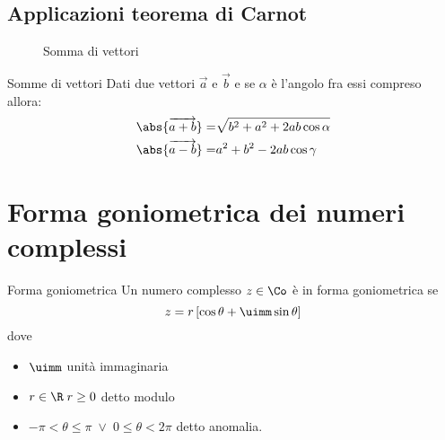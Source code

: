\section{Applicazioni teorema di Carnot}

\begin{figure}
	\centering
	
	\caption{Somma di vettori}
	\label{fig:parasommavettori}
\end{figure}

\begin{teoremat}{Somme di vettori}{}
	Dati due vettori $\vec{a}$ e $\vec{b}$ e se $\alpha$ è l'angolo fra essi compreso allora:
	\begin{align*}
	\abs{\overrightarrow{a+b}}=&\sqrt{b^2+a^2+2ab\cos\alpha}\\
\abs{\overrightarrow{a-b}}=&a^2+b^2-2ab\cos\gamma
	\end{align*}
\end{teoremat}
\chapter{Forma goniometrica dei numeri complessi}
\begin{definizionet}{Forma goniometrica}{}
Un numero complesso $z\in\Co$ è in forma goniometrica se
\[z=r\left[\cos\theta+\uimm\sin\theta \right] \] dove
\begin{itemize}
\item $\uimm$ unità immaginaria
\item $r\in\R\; r\geq 0$ detto modulo
\item $-\pi <\theta\leq\pi\; \vee\; 0\leq\theta<2\pi$ detto anomalia.
\end{itemize}
\end{definizionet}

